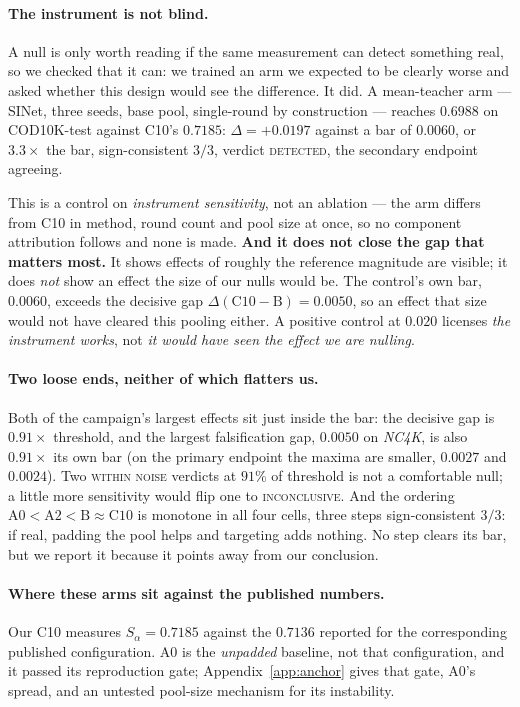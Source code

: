 \documentclass{article} %
\begin{document}
\paragraph{The instrument is not blind.} A null is only worth reading if the same measurement can
detect something real, so we checked that it can: we trained an arm we expected to be clearly worse
and asked whether this design would see the difference. It did. A mean-teacher arm --- SINet, three
seeds, base pool, single-round by construction --- reaches $0.6988$ on COD10K-test against C10's
$0.7185$: $\Delta = +0.0197$ against a bar of $0.0060$, or $3.3\times$ the bar, sign-consistent $3/3$,
verdict \textsc{detected}, the secondary endpoint agreeing.

This is a control on \emph{instrument sensitivity}, not an ablation --- the arm differs from C10 in
method, round count and pool size at once, so no component attribution follows and none is made.
\textbf{And it does not close the gap that matters most.} It shows effects of roughly the reference
magnitude are visible; it does \emph{not} show an effect the size of our nulls would be. The
control's own bar, $0.0060$, exceeds the decisive gap $\Delta(\mathrm{C10}-\mathrm{B}) = 0.0050$, so
an effect that size would not have cleared this pooling either. A positive control at $0.020$
licenses \emph{the instrument works}, not \emph{it would have seen the effect we are nulling}.

\paragraph{Two loose ends, neither of which flatters us.} Both of the campaign's largest effects sit just inside the bar: the decisive gap is $0.91\times$
threshold, and the largest falsification gap, $0.0050$ on \emph{NC4K}, is also $0.91\times$ its own
bar (on the primary endpoint the maxima are smaller, $0.0027$ and $0.0024$). Two \textsc{within
noise} verdicts at $91\%$ of threshold is not a comfortable null; a little more sensitivity would
flip one to \textsc{inconclusive}. And the ordering $\mathrm{A0}<\mathrm{A2}<\mathrm{B}\approx
\mathrm{C10}$ is monotone in all four cells, three steps sign-consistent $3/3$: if real, padding the
pool helps and targeting adds nothing. No step clears its bar, but we report it because it points
away from our conclusion.

\paragraph{Where these arms sit against the published numbers.} Our C10 measures
$S_\alpha = 0.7185$ against the $0.7136$ reported for the corresponding published configuration. A0
is the \emph{unpadded} baseline, not that configuration, and it passed its reproduction gate;
Appendix~\ref{app:anchor} gives that gate, A0's spread, and an untested pool-size mechanism for its
instability.
\end{document}
